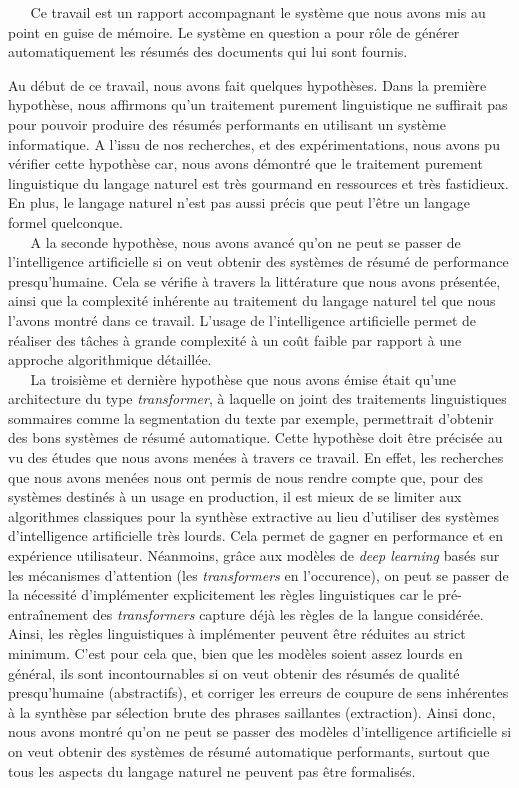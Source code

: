 $ _{} $ $ _{} $ $ _{} $ $ _{} $ $ _{} $Ce travail est un rapport accompagnant le système que nous avons mis au point en guise de mémoire. Le système en question a pour rôle de générer automatiquement les résumés des documents qui lui sont fournis.

Au début de ce travail, nous avons fait quelques hypothèses. Dans la première hypothèse, nous affirmons qu'un traitement purement linguistique ne suffirait pas pour pouvoir produire des résumés performants en utilisant un système informatique. A l'issu de nos recherches, et des expérimentations, nous avons pu vérifier cette hypothèse car, nous avons démontré que le traitement purement linguistique du langage naturel est très gour\-mand en ressources et très fastidieux. En plus, le langage naturel n'est pas aussi précis que peut l'être un langage formel quelconque.\\
$ _{} $ $ _{} $ $ _{} $ $ _{} $ $ _{} $A la seconde hypothèse, nous avons avancé qu'on ne peut se passer de l'intelligence artificielle si on veut obtenir des systèmes de résumé de performance presqu'humaine. Cela se vérifie à travers la littérature que nous avons présentée, ainsi que la complexité inhérente au traitement du langage naturel tel que nous l'avons montré dans ce travail. L'usage de l'intelligence artificielle permet de réaliser des tâches à grande complexité à un coût faible par rapport à une approche algorithmique détaillée.\\
$ _{} $ $ _{} $ $ _{} $ $ _{} $ $ _{} $La troisième et dernière hypothèse que nous avons émise était qu'une architecture du type \textit{transformer}, à laquelle on joint des traitements lin\-guis\-ti\-ques sommaires comme la segmentation du texte par exemple, permettrait d'obtenir des bons systèmes de résumé automatique. Cette hypothèse doit être précisée au vu des études que nous avons menées à travers ce travail. En effet, les recherches que nous avons menées nous ont permis de nous rendre compte que, pour des systèmes destinés à un usage en production, il est mieux de se limiter aux algorithmes classiques pour la synthèse extractive au lieu d'utiliser des systèmes d'intelligence artificielle très lourds. Cela permet de gagner en performance et en expérience utilisateur. Néanmoins, grâce aux modèles de \textit{deep learning} basés sur les mécanismes d'attention (les \textit{transformers} en l'occurence), on peut se passer de la nécessité d'implémenter explicitement les règles lin\-guis\-ti\-ques car le pré-entraînement des \textit{transformers} capture déjà les règles de la langue considérée. Ainsi, les règles linguistiques à implémenter peuvent être réduites au strict minimum. C'est pour cela que, bien que les modèles soient assez lourds en général, ils sont incontournables si on veut obtenir des résumés de qualité presqu'humaine (abstractifs), et corriger les erreurs de coupure de sens inhérentes à la synthèse par sélection brute des phrases saillantes (extraction). Ainsi donc, nous avons montré qu'on ne peut se passer des modèles d'intelligence artificielle si on veut obtenir des systèmes de résumé automatique performants, surtout que tous les aspects du langage naturel ne peuvent pas être formalisés.\\

